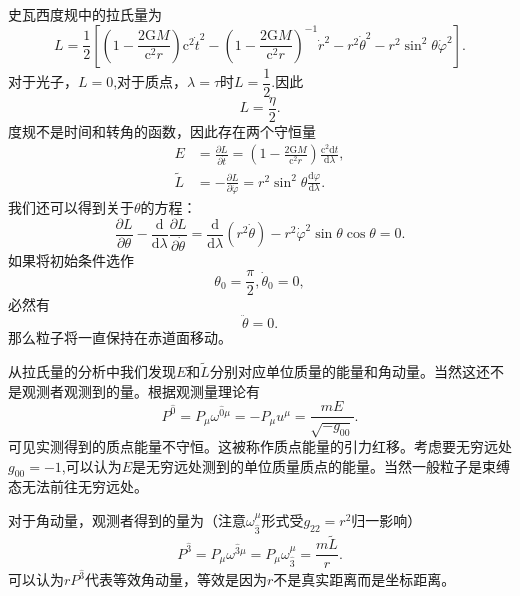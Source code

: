 \documentclass[11pt, a4paper, oneside, onecolumn]{ctexart}
\numberwithin{equation}{subsection}
\begin{document}
史瓦西度规中的拉氏量为
\begin{equation}
L=\frac12\left[\left(1-\frac{2\mathrm{G}M}{\mathrm{c}^{2}r}\right)\mathrm{c}^{2}\dot{t}^{2}-\left(1-\frac{2\mathrm{G}M}{\mathrm{c}^{2}r}\right)^{-1}\dot{r}^{2}-r^{2}\dot{\theta}^{2}-r^{2}\sin^{2}\theta\dot{\varphi}^{2}\right].
\end{equation}
对于光子，$L=0$,对于质点，$\lambda=\tau$时$L=\dfrac12$.因此
\begin{equation}
L=\frac{\eta}{2}.
\end{equation}
度规不是时间和转角的函数，因此存在两个守恒量
\begin{align}
E&=\frac{\partial{}L}{\partial{}\dot{t}}=\left(1-\frac{2\mathrm{G}M}{\mathrm{c}^{2}r}\right)\frac{\mathrm{c}^{2}\mathrm{d}t}{\mathrm{d}\lambda},\\
\widetilde{L}&=-\frac{\partial{}L}{\partial{}\dot{\varphi}}=r^{2}\sin^{2}\theta\frac{\mathrm{d}\varphi}{\mathrm{d}\lambda}.
\end{align}
我们还可以得到关于$\theta$的方程：
\begin{equation}
\frac{\partial{}L}{\partial{}\theta}-\frac{\mathrm{d}}{\mathrm{d}\lambda}\frac{\partial{}L}{\partial{}\dot{\theta}}=\frac{\mathrm{d}}{\mathrm{d}\lambda}\left(r^{2}\dot{\theta}\right)-r^{2}\dot{\varphi}^{2}\sin\theta\cos\theta=0.
\end{equation}
如果将初始条件选作
\begin{equation}
\theta_{0}=\frac{\pi}{2},\dot{\theta}_{0}=0,
\end{equation}
必然有
\begin{equation}
\ddot{\theta}=0.
\end{equation}
那么粒子将一直保持在赤道面移动。

\newpage
从拉氏量的分析中我们发现$E$和$\widetilde{L}$分别对应单位质量的能量和角动量。当然这还不是观测者观测到的量。根据观测量理论有
\begin{equation}
P^{\hat{0}}=P_{\mu}\omega^{\hat{0}\mu}=-P_{\mu}u^{\mu}=\frac{mE}{\sqrt{-g_{00}}}.
\end{equation}
可见实测得到的质点能量不守恒。这被称作质点能量的引力红移。考虑要无穷远处$g_{00}=-1$,可以认为$E$是无穷远处测到的单位质量质点的能量。当然一般粒子是束缚态无法前往无穷远处。

对于角动量，观测者得到的量为（注意$\omega_{\hat{3}}^{\mu}$形式受$g_{22}=r^{2}$归一影响）
\begin{equation}
P^{\hat{3}}=P_{\mu}\omega^{\hat{3}\mu}=P_{\mu}\omega^{\mu}_{\hat{3}}=\frac{m\widetilde{L}}{r}.
\end{equation}
可以认为$r P^{\hat{3}}$代表等效角动量，等效是因为$r$不是真实距离而是坐标距离。
\end{document}
